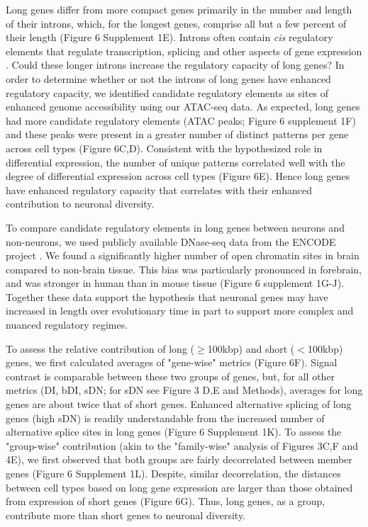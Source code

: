 Long genes differ from more compact genes primarily in the number and length of their introns, which, for the longest genes, comprise all but a few percent of their length (Figure 6 Supplement 1E). Introns often contain \textit{cis} regulatory elements that regulate transcription, splicing and other aspects of gene expression \citep{Rebollo_2012,Friedli_2015}. Could these longer introns increase the regulatory capacity of long genes? In order to determine whether or not the introns of long genes have enhanced regulatory capacity, we identified candidate regulatory elements as sites of enhanced genome accessibility using our ATAC-seq data. As expected, long genes had more candidate regulatory elements (ATAC peaks; Figure 6 supplement 1F) and these peaks were present in a greater number of distinct patterns per gene across cell types (Figure 6C,D). Consistent with the hypothesized role in differential expression, the number of unique patterns correlated well with the degree of differential expression across cell types (Figure 6E). Hence long genes have enhanced regulatory capacity that correlates with their enhanced contribution to neuronal diversity.

To compare candidate regulatory elements in long genes between neurons and non-neurons, we used publicly available DNase-seq data from the ENCODE project \citep{Dunham_2012}. We found a significantly higher number of open chromatin sites in brain compared to non-brain tissue. This bias was particularly pronounced in forebrain, and was stronger in human than in mouse tissue (Figure 6 supplement 1G-J). Together these data support the hypothesis that neuronal genes may have increased in length over evolutionary time in part to support more complex and nuanced regulatory regimes. 

To assess the relative contribution of long ($\geq$100kbp) and short ($<$100kbp) genes, we first calculated averages of "gene-wise" metrics (Figure 6F). Signal contrast is comparable between these two groups of genes, but, for all other metrics (DI, bDI, sDN; for sDN see Figure 3 D,E and Methods), averages for long genes are about twice that of short genes. Enhanced alternative splicing of long genes (high sDN) is readily understandable from the increased number of alternative splice sites in long genes (Figure 6 Supplement 1K). To assess the "group-wise" contribution (akin to the "family-wise" analysis of Figures 3C,F and 4E), we first observed that both groups are fairly decorrelated between member genes (Figure 6 Supplement 1L). Despite, similar decorrelation, the distances between cell types based on long gene expression are larger than those obtained from expression of short genes (Figure 6G). Thus, long genes, as a group, contribute more than short genes to neuronal diversity. 








